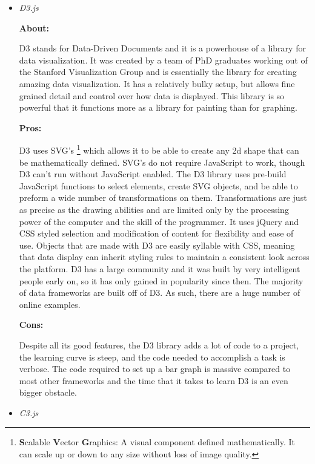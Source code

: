 \documentclass[draftclsnofoot,onecolumn,letterpaper,10pt]{IEEEtran}
\begin{document}
	\begin{itemize}

		\item{\textit{D3.js}}


			\textbf{About:}

			D3 stands for Data-Driven Documents and it is a powerhouse of a library for data visualization.\cite{d3.org}
			It was created by a team of PhD graduates working out of the Stanford Visualization Group and is essentially the library for creating amazing data visualization.\cite{d3Journal}
			It has a relatively bulky setup, but allows fine grained detail and control over how data is displayed.
			This library is so powerful that it functions more as a library for painting than for graphing.

			\noindent \textbf{Pros:}

			D3 uses SVG's \footnote{\textbf{S}calable \textbf{V}ector \textbf{G}raphics: A visual component defined mathematically. It can scale up or down to any size without loss of image quality.} which allows it to be able to create any 2d shape that can be mathematically defined.
			SVG's do not require JavaScript to work, though D3 can't run without JavaScript enabled.
			The D3 library uses pre-build JavaScript functions to select elements, create SVG objects, and be able to preform a wide number of transformations on them.\cite{d3.org}
			Transformations are just as precise as the drawing abilities and are limited only by the processing power of the computer and the skill of the programmer.
			It uses jQuery and CSS styled selection and modification of content for flexibility and ease of use.
			Objects that are made with D3 are easily syllable with CSS, meaning that data display can inherit styling rules to maintain a consistent look across the platform.
			D3 has a large community and it was built by very intelligent people early on, so it has only gained in popularity since then.\cite{DataVisProCon}
			The majority of data frameworks are built off of D3.
			As such, there are a huge number of online examples.

			\noindent \textbf{Cons:}

			Despite all its good features, the D3 library adds a lot of code to a project, the learning curve is steep, and the code needed to accomplish a task is verbose.\cite{DataVisProCon}
			The code required to set up a bar graph is massive compared to most other frameworks and the time that it takes to learn D3 is an even bigger obstacle.


		\item{\textit{C3.js}}



\end{itemize}
\end{document}
